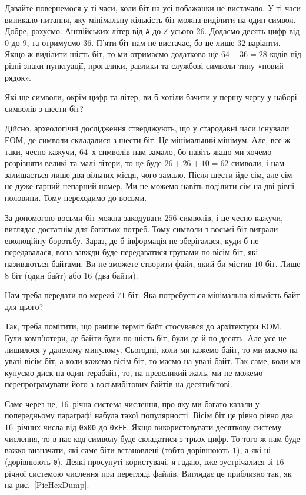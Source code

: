 \documentclass{book}
\newcommand{\bitstr}[1]{{\tt #1}}
\newcommand{\hexstr}[1]{{\tt 0x#1}}
\begin{document}
Давайте повернемося у ті часи, коли біт на усі побажанки не вистачало.
У ті часи виникало питання, яку мінімальну кількість біт можна виділити на один символ.
Добре, рахуємо.
Англійських літер від \bitstr{A} до \bitstr{Z} усього $26$.
Додаємо десять цифр від $0$ до $9$, та отримуємо $36$.
П'яти біт нам не вистачає, бо це лише $32$ варіанти.
Якщо ж виділити шість біт, то ми отримаємо додатково ще $64-36=28$ кодів під різні знаки пунктуації, прогалики, равлики та службові символи типу «новий рядок».

\begin{exercise}
Які ще символи, окрім цифр та літер, ви б хотіли бачити у першу чергу у наборі символів з шести біт?
\end{exercise}

Дійсно, археологічні дослідження стверджують, що у стародавні часи існували ЕОМ, де символи складалися з шести біт.
Це мінімальний мінімум.
Але, все ж таки, чесно кажучи, $64$--х символів нам замало, бо навіть якщо ми хочемо розрізняти великі та малі літери, то це буде $26+26+10=62$ символи, і нам залишається лише два вільних місця, чого замало.
Після шести йде сім, але сім не дуже гарний непарний номер.
Ми не можемо навіть поділити сім на дві рівні половини.
Тому переходимо до восьми.

За допомогою восьми біт можна закодувати $256$ символів, і це чесно кажучи, виглядає достатнім для багатьох потреб.
Тому символи з восьмі біт виграли еволюційну боротьбу.
Зараз, де б інформація не зберігалася, куди б не передавалася, вона завжди буде передаватися групами по вісім біт, які називаються байтами.
Ви не зможете створити файл, який би містив $10$ біт. Лише $8$ біт (один байт) або $16$ (два байти).

\begin{exercise}
Нам треба передати по мережі $71$ біт. Яка потребується мінімальна кількість байт для цього?
\end{exercise}

Так, треба помітити, що раніше терміт байт стосувався до архітектури ЕОМ.
Були комп'ютери, де байти були по шість біт, були де й по десять.
Але усе це лишилося у далекому минулому.
Сьогодні, коли ми кажемо байт, то ми маємо на увазі вісім біт, а коли кажемо вісім біт, то маємо на увазі байт.
Так саме, коли ми купуємо диск на один терабайт, то, на превеликий жаль, ми не можемо перепрограмувати його з восьмибітових байтів на десятибітові.

Саме через це, $16$--річна система числення, про яку ми багато казали у попередньому параграфі набула такої популярності.
Вісім біт це рівно рівно два $16$--річних числа від \hexstr{00} до \hexstr{FF}.
Якщо використовувати десяткову систему числення, то в нас код символу буде складатися з трьох цифр.
То того ж нам буде важко визначати, які саме біти встановлені (тобто дорівнюють \bitstr{1}), а які ні (дорівнюють \bitstr{0}).
Деякі просунуті користувачі, я гадаю, вже зустрічалися зі $16$--річної системою числення при перегляді файлів.
Виглядає це приблизно так, як на рис.~\ref{PicHexDump}.
\end{document}
